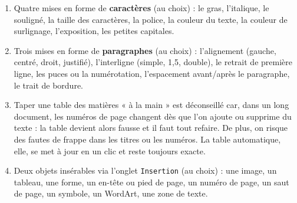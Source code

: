 \documentclass[11pt]{article}
\begin{document}
\begin{corrige}
\begin{enumerate}
\item Quatre mises en forme de \textbf{caractères} (au choix) : le gras, l'italique, le souligné, la taille des caractères, la police, la couleur du texte, la couleur de surlignage, l'exposition, les petites capitales.
\item Trois mises en forme de \textbf{paragraphes} (au choix) : l'alignement (gauche, centré, droit, justifié), l'interligne (simple, 1,5, double), le retrait de première ligne, les puces ou la numérotation, l'espacement avant/après le paragraphe, le trait de bordure.
\item Taper une table des matières « à la main » est déconseillé car, dans un long document, les numéros de page changent dès que l'on ajoute ou supprime du texte : la table devient alors fausse et il faut tout refaire. De plus, on risque des fautes de frappe dans les titres ou les numéros. La table automatique, elle, se met à jour en un clic et reste toujours exacte.
\item Deux objets insérables via l'onglet \texttt{Insertion} (au choix) : une image, un tableau, une forme, un en-tête ou pied de page, un numéro de page, un saut de page, un symbole, un WordArt, une zone de texte.
\end{enumerate}
\end{corrige}
\end{document}
